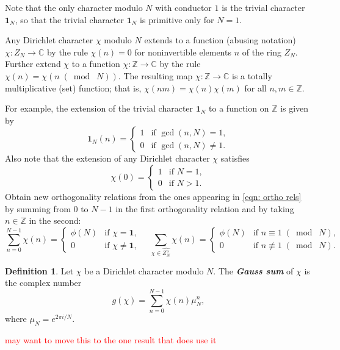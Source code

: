 \documentclass[10pt,leqno,twoside]{article}
\theoremstyle{plain}
\theoremstyle{definition}
\newtheorem{definition/}[lem]{Definition}
\newenvironment{definition}
  {\renewcommand{\qedsymbol}{\textdagger}%
   \pushQED{\qed}\begin{definition/}}
  {\popQED\end{definition/}}
\numberwithin{equation}{section}
\numberwithin{lem}{section}
\newcommand{\textib}[1]{\textbf{\textit{#1\index{#1}}}} %
\newcommand{\smod}[1]{\;(\bmod\; #1)}
\newcommand{\sai}[1]{\textcolor{red}{#1}}
\begin{document}
Note that the only character modulo $N$ with conductor $1$ is the trivial character $\mathbf 1_N$, so that the trivial character $\mathbf 1_N$ is primitive only for $N = 1$.

Any Dirichlet character $\chi$ modulo $N$ extends to a function (abusing notation) $\chi\colon Z_N\to\mathbb C$ by the rule $\chi(n) = 0$ for noninvertible elements $n$ of the ring $Z_N$. Further extend $\chi$ to a function $\chi\colon\mathbb Z\to\mathbb C$ by the rule $\chi(n) = \chi(n\smod N)$. The resulting map $\chi\colon \mathbb Z\to \mathbb C$ is a totally multiplicative (set) function; that is, $\chi(nm) = \chi(n)\chi(m)$ for all $n,m\in \mathbb Z$.

For example, the extension of the trivial character $\mathbf 1_N$ to a function on $\mathbb Z$ is given by
\[\mathbf 1_N(n) = \begin{cases}
    1 & \text{if $\gcd(n,N)=1$},\\
    0 & \text{if $\gcd(n,N)\neq1$}.
\end{cases}\]
Also note that the extension of any Dirichlet character $\chi$ satisfies 
\[\chi(0) = \begin{cases}
    1 & \text{if $N = 1$},\\
    0 & \text{if $N > 1$}.
\end{cases}\]
Obtain new orthogonality relations from the ones appearing in \cref{eqn: ortho rels} by summing from $0$ to $N-1$ in the first orthogonality relation and by taking $n\in\mathbb Z$ in the second:
\begin{equation}\label{eqn: new ortho rels}
    \sum_{n=0}^{N-1}\chi(n) = \begin{cases}
        \phi(N) & \text{if $\chi = \mathbf 1$},\\
        0 & \text{if $\chi\neq \mathbf 1$},
    \end{cases}\quad\sum_{\chi\in \widehat{Z_N^\times}}\chi(n) = \begin{cases}
        \phi(N) & \text{if $n\equiv 1\smod N$},\\
        0 & \text{if $n\not\equiv 1\smod N$}.
    \end{cases} 
\end{equation}
\begin{definition}
    Let $\chi$ be a Dirichlet character modulo $N$. The \textib{Gauss sum} of $\chi$ is the complex number
    \[g(\chi) = \sum_{n=0}^{N-1}\chi(n)\mu_N^n,\] where $\mu_N = e^{2\pi i/N}$.
\end{definition} \sai{may want to move this to the one result that does use it}
\end{document}
